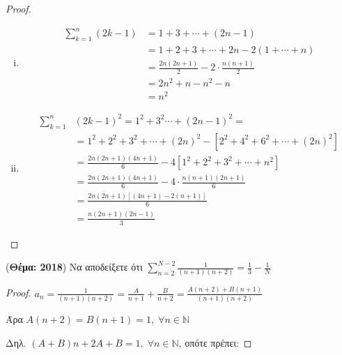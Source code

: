 \begin{multicols}{2}
\begin{enumerate}
        \begin{proof}
        \item {}
            \begin{enumerate}[i)]
                \item \begin{align*}
                \sum_{k=1}^{n} (2k-1) &= 1 + 3 + \cdots + (2n-1) \\
                                      &=1 + 2 + 3 +\cdots +2n - 2(1+\cdots +n) \\
                                      &= \frac{2n(2n+1)}{2}-2 \cdot \frac{n(n+1)}{2} \\
                                      &=2n^{2}+n-n^{2}-n \\
                                      &=n^{2}
            \end{align*}

        \item \begin{align*}
                \sum_{k=1}^{n}& (2k-1)^{2} 
                =1^{2}+3^{2}\cdots + (2n-1)^{2} = \\
                &=1^{2}+2^{2}+3^{2}+\cdots +(2n)^{2}-[2^{2}+4^{2}+6^{2}+\cdots +
                (2n)^{2}] \\
                &= \frac{2n(2n+1)(4n+1)}{6} - 4[1^{2}+2^{2}+3^{2}+\cdots +n^{2}] \\
                &= \frac{2n(2n+1)(4n+1)}{6} - 4 \cdot \frac{n(n+1)(2n+1)}{6} \\
                &= \frac{2n(2n+1)[(4n+1)-2(n+1)]}{6} \\
                &= \frac{n(2n+1)(2n-1)}{3} 
        \end{align*}
            \end{enumerate}
        \end{proof}

    \item \label{ask:thema18sum} \textcolor{Col1}{({\bfseries Θέμα: 2018}) 
        Να αποδείξετε ότι $ \sum_{n=2}^{N-2} \frac{1}{(n+1)(n+2)} 
        = \frac{1}{3} - \frac{1}{N} $}

        \begin{proof}
        \item {}
            $ a_n = \frac{1}{(n+1)(n+2)} = \frac{A}{n+1} + \frac{B}{n+2} = 
            \frac{A(n+2)+B(n+1)}{(n+1)(n+2)} $

            Άρα $A(n+2) = B(n+1) = 1, \; \forall n \in \mathbb{N}$

            Δηλ. $ (A+B)n+2A+B=1, \; \forall n \in \mathbb{N} $, οπότε πρέπει:


\end{proof}
\end{enumerate}
\end{multicols}

